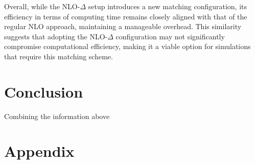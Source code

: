 \documentclass[NOTE, REPORT=true, atlasdraft=true, USenglish]{atlasdoc}
\begin{document}
Overall, while the NLO-$\Delta$ setup introduces a new matching configuration, its efficiency in terms of computing time remains closely aligned with that of the regular NLO approach, maintaining a manageable overhead. This similarity suggests that adopting the NLO-$\Delta$ configuration may not significantly compromise computational efficiency, making it a viable option for simulations that require this matching scheme.

\chapter{Conclusion}
\label{chap:discussion}

Combining the information above
\clearpage


\chapter*{Appendix}
\lstset{style=mystyle}
\end{document}
